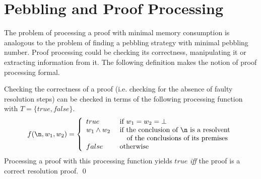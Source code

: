 \section{Pebbling and Proof Processing}
\label{sec:pebblingchecking}

The problem of processing a proof with minimal memory consumption is analogous to the problem of finding a pebbling strategy with minimal pebbling number.
Proof processing could be checking its correctness, manipulating it or extracting information from it.
The following definition makes the notion of proof processing formal.


\begin{example}

Checking the correctness of a proof (i.e. checking for the absence of faulty resolution steps) can be checked in terms of the following processing function with $T = \{true,false\}$.
$$
f(\n,w_1,w_2) = \left\{
\begin{array}{ll}
	true & \text{ if $w_1 = w_2 = \bot$} \\
	w_1 \wedge w_2 &\text{ if the conclusion of $\n$ is a resolvent}\\
								 &\quad \text{ of the conclusions of its premises} \\
	false & \text{ otherwise}
\end{array}
\right.
$$
Processing a proof with this processing function yields $true$ \emph{iff} the proof is a correct resolution proof.
\qed
\end{example}

